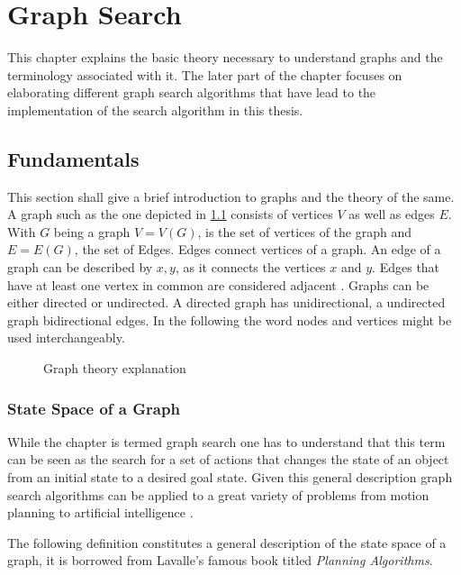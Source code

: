 \chapter{Graph Search}
\label{ch:graphSearch}
This chapter explains the basic theory necessary to understand graphs and the terminology associated with it. The later part of the chapter focuses on elaborating different graph search algorithms that have lead to the implementation of the search algorithm in this thesis.

\section{Fundamentals}

This section shall give a brief introduction to graphs and the theory of the same. A graph such as the one depicted in \ref{fig:Graph} consists of vertices $V$ as well as edges $E$. With $G$ being a graph $V = V(G)$, is the set of vertices of the graph and $E = E(G)$, the set of Edges. Edges connect vertices of a graph. An edge of a graph can be described by ${x,y}$, as it connects the vertices $x$ and $y$. Edges that have at least one vertex in common are considered adjacent \cite{Bollobas.1979}. Graphs can be either directed or undirected. A directed graph has unidirectional, a undirected graph bidirectional edges. In the following the word nodes and vertices might be used interchangeably.

\begin{figure}[h]
    \caption{Graph theory explanation}
    \label{fig:Graph}
\end{figure}

\subsection{State Space of a Graph}
While the chapter is termed graph search one has to understand that this term can be seen as the search for a set of actions that changes the state of an object from an initial state to a desired goal state. Given this general description graph search algorithms can be applied to a great variety of problems from motion planning to artificial intelligence \cite{LaValle.2006}.

The following definition constitutes a general description of the state space of a graph, it is borrowed from Lavalle's famous book titled \emph{Planning Algorithms}. 

